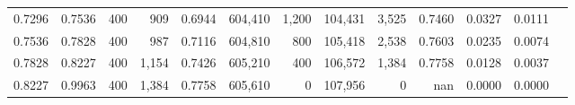 \begin{tabular}{rrrrrrrrrrrrr}
0.7296 & 0.7536 &    400 &   909 &                                     0.6944 & 604,410 &   1,200 & 104,431 &   3,525 & 0.7460 & 0.0327 & 0.0111 \\
0.7536 & 0.7828 &    400 &   987 &                                     0.7116 & 604,810 &     800 & 105,418 &   2,538 & 0.7603 & 0.0235 & 0.0074 \\
0.7828 & 0.8227 &    400 & 1,154 &                                     0.7426 & 605,210 &     400 & 106,572 &   1,384 & 0.7758 & 0.0128 & 0.0037 \\
0.8227 & 0.9963 &    400 & 1,384 &                                     0.7758 & 605,610 &       0 & 107,956 &       0 &    nan & 0.0000 & 0.0000 \\
\bottomrule
\end{tabular}
